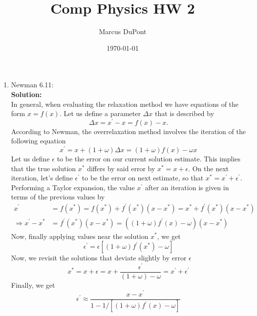 \documentclass{article}
\title{Comp Physics HW 2}
\author{Marcus DuPont}
\date{\today}
\begin{document}
\maketitle

\begin{enumerate}
    \item {Newman 6.11:\\
    
    \textbf{Solution:}\\
    In general, when evaluating the relaxation method we have equations of the form $x = f(x)$.
    Let us define a parameter $\Delta x$ that is described by
    \begin{equation}
        \Delta x = x^\prime -x = f(x) - x .
    \end{equation}
    According to Newman, the overrelaxation method involves the iteration of the following equation 
    \begin{equation}
        x^\prime = x + (1+\omega)\Delta x = (1+\omega)f(x) - \omega x
    \end{equation}
    Let us define $\epsilon$ to be the error on our current solution estimate. This implies that the true solution $x^*$ differs by said error by $x^* = x + \epsilon$. On the next iteration, let's define $\epsilon^\prime$ to be the error on next estimate, so that $x^* = x^\prime + \epsilon^\prime$. Performing a Taylor expansion, the value $x^\prime$ after an iteration is given in terms of the previous values by
    \begin{equation}
    \begin{split}
         x^\prime &= f(x^*) = f(x^*) + f^\prime(x^*)(x-x^*)
        = x^* + f^\prime(x^*)(x-x^*)\\
        \Rightarrow x^\prime - x^* &= f^\prime(x^*)(x-x^*) = ((1+\omega)f^\prime(x) - \omega)(x-x^*)
    \end{split}
    \end{equation}
    Now, finally applying values near the solution $x^*$, we get
    \begin{equation*}
        \epsilon^\prime = \epsilon \left[(1+\omega)f^\prime(x^*) - \omega \right]
    \end{equation*}
    Now, we revisit the solutions that deviate slightly by error $\epsilon$
    \begin{equation*}
        x^* = x + \epsilon = x + \frac{\epsilon^\prime}{(1+\omega) - \omega} = x^\prime + \epsilon^\prime
    \end{equation*}
    Finally, we get
    \begin{equation}
        \epsilon^\prime \approx \frac{x-x^\prime}{1 - 1/[(1+\omega)f^\prime(x) - \omega]}
    \end{equation}
    
}
\end{enumerate}
\end{document}
